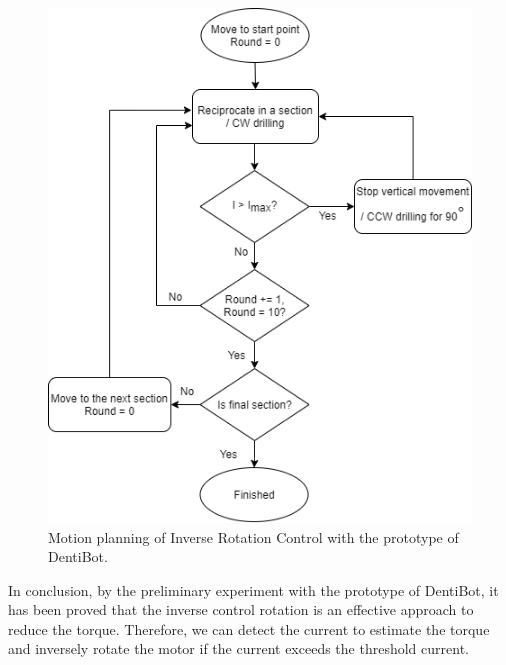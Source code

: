 \begin{figure}[htbp]
\begin{center}
\includegraphics[width=0.8\linewidth]{Images/inverse_rotation.png}
\caption{Motion planning of Inverse Rotation Control with the prototype of DentiBot.}
\label{fig: inverse_rotation} 
\end{center}
\end{figure}
\par
In conclusion, by the preliminary experiment with the prototype of DentiBot, it has been proved that the inverse control rotation is an effective approach to reduce the torque. Therefore, we can detect the current to estimate the torque and inversely rotate the motor if the current exceeds the threshold current. 
